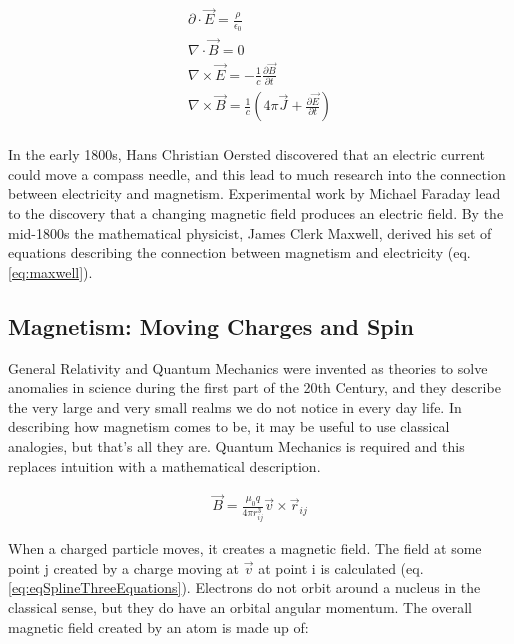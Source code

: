 \begin{equation}
\begin{split}
\partial \cdot \vec{E} = \frac{\rho}{\epsilon_0} \\
\nabla \cdot \vec{B} = 0 \\
\nabla \times \vec{E} = -\frac{1}{c} \frac{\partial\vec{B}}{\partial t} \\
\nabla \times \vec{B} = \frac{1}{c}\left(4 \pi \vec{J} + \frac{\partial \vec{E}}{\partial t}\right) \\
\end{split}
\label{eq:maxwell}
\end{equation}

In the early 1800s, Hans Christian Oersted discovered that an electric current could move a compass needle, and this lead to much research into the connection between electricity and magnetism.  Experimental work by Michael Faraday lead to the discovery that a changing magnetic field produces an electric field.  By the mid-1800s the mathematical physicist, James Clerk Maxwell, derived his set of equations describing the connection between magnetism and electricity (eq. \ref{eq:maxwell}). 


\subsection{Magnetism: Moving Charges and Spin}

General Relativity and Quantum Mechanics were invented as theories to solve anomalies in science during the first part of the 20th Century, and they describe the very large and very small realms we do not notice in every day life.  In describing how magnetism comes to be, it may be useful to use classical analogies, but that's all they are.  Quantum Mechanics is required and this replaces intuition with a mathematical description.

\begin{equation}
\begin{split}
\vec{B} = \frac{\mu_0 q}{4 \pi r_{ij}^3} \vec{v} \times \vec{r}_{ij}
\end{split}
\label{eq:eqSplineThreeEquations}
\end{equation}

When a charged particle moves, it creates a magnetic field.  The field at some point j created by a charge moving at $\vec{v}$ at point i is calculated (eq. \ref{eq:eqSplineThreeEquations}).  Electrons do not orbit around a nucleus in the classical sense, but they do have an orbital angular momentum.  The overall magnetic field created by an atom is made up of:

